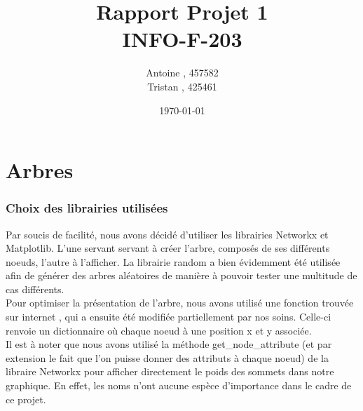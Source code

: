 \documentclass[a4paper]{report}
\title{Rapport Projet 1 \\ INFO-F-203}
\author{Antoine \bsc{Lemahieu}, 457582 \\
Tristan \bsc{Philips}, 425461}
\date{\today}
\begin{document}
\maketitle
\renewcommand{\contentsname}{Sommaire}
\tableofcontents
\part{Arbres}
\section{Choix des librairies utilisées}
Par soucis de facilité, nous avons décidé d'utiliser les librairies Networkx et Matplotlib. L'une servant servant à créer l'arbre, composés de ses différents noeuds, l'autre à l'afficher. La librairie random a bien évidemment été utilisée afin de générer des arbres aléatoires de manière à pouvoir tester une multitude de cas différents.
\\Pour optimiser la présentation de l'arbre, nous avons utilisé une fonction trouvée sur internet \cite{hierarchypos}, qui a ensuite été modifiée partiellement par nos soins. Celle-ci renvoie un dictionnaire où chaque noeud à une position x et y associée.
\\Il est à noter que nous avons utilisé la méthode get\_node\_attribute (et par extension le fait que l'on puisse donner des attributs à chaque noeud) de la libraire Networkx pour afficher directement le poids des sommets dans notre graphique. En effet, les noms n'ont aucune espèce d'importance dans le cadre de ce projet.
\end{document}
